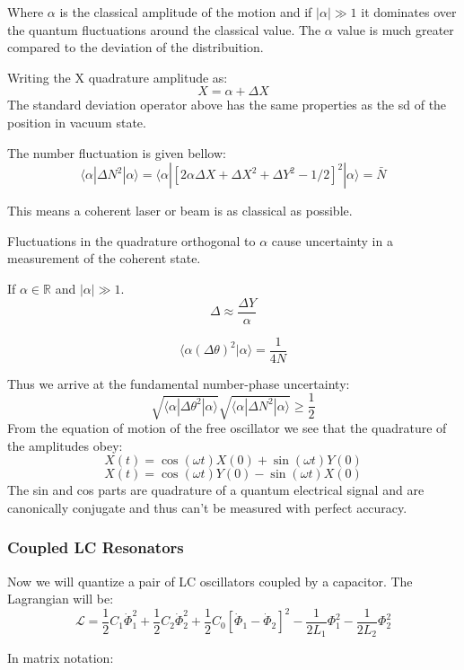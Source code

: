 \documentclass[12pt]{article}
\numberwithin{equation}{subsection}
\newcommand\ask[1]{
{%
}
}
\newcommand\page[1]{
{
}
}
\begin{document}
Where $\alpha$ is the classical amplitude of the motion and if $|\alpha|\gg 1$ it dominates over the quantum fluctuations around the classical value. The $\alpha$ value is much greater compared to the deviation of the distribuition.

Writing the X quadrature amplitude as:
\begin{equation}
    X = \alpha + \Delta X
\end{equation}
The standard deviation operator above has the same properties as the sd of the position in vacuum state.

The number fluctuation is given bellow:
\begin{equation}
    \langle \alpha | \Delta N ^2|\alpha \rangle =     \langle \alpha |[2\alpha\Delta X + \Delta X ^2 + \Delta Y ^2 -1/2]^2 |\alpha \rangle = \bar N
\end{equation}

This means a coherent laser or beam is as classical as possible.

Fluctuations in the quadrature orthogonal to $\alpha$ cause uncertainty in a measurement of the coherent state. 
\ask{What does that mean? I don't understand}
If $\alpha \in \mathbb{R}$ and $|\alpha|\gg 1$. 
\begin{equation}
    \Delta \approx \frac{\Delta Y}{\alpha}
\end{equation}

\begin{equation}
\langle \alpha (\Delta \theta)^2|\alpha \rangle = \frac{1}{4N}
\end{equation}

\page{22}
Thus we arrive at the fundamental number-phase uncertainty:
\begin{equation}
\sqrt{     \langle \alpha | \Delta \theta ^2|\alpha\rangle}  \sqrt{     \langle \alpha | \Delta N ^2|\alpha\rangle} \ge  \frac{1}{2}
\end{equation}
From the equation of motion of the free oscillator we see that the quadrature of the amplitudes obey:
\begin{equation}
X(t) = \cos (\omega t) X(0)    +\sin (\omega t) Y(0)
\end{equation}
\begin{equation}
X(t) = \cos (\omega t) Y(0)    -\sin (\omega t) X(0)
\end{equation}
The sin and cos parts are quadrature of a quantum electrical signal and are canonically conjugate and thus can't be measured with perfect accuracy.
\subsubsection{Coupled LC Resonators}
Now we will quantize a pair of LC oscillators coupled by a capacitor. The Lagrangian will be:
\begin{equation}
    \mathcal{L} = \frac{1}{2} C_1\dot\Phi^2_1 +\frac{1}{2} C_2\dot\Phi^2_2+ \frac{1}{2} C_0 [\dot \Phi _1-\dot \Phi _2]^2- \frac{1}{2L_1}\Phi^2_1 - \frac{1}{2L_2}\Phi^2_2
\end{equation}
\page{23}
In matrix notation:
 
\end{document}
